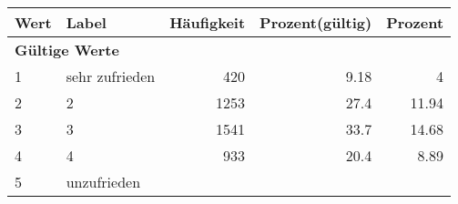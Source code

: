      \begin{longtable}{lXrrr}
     \toprule
     \textbf{Wert} & \textbf{Label} & \textbf{Häufigkeit} & \textbf{Prozent(gültig)} & \textbf{Prozent} \\
     \endhead
     \midrule
     \multicolumn{5}{l}{\textbf{Gültige Werte}}\\

     1 &
     \multicolumn{1}{X}{ sehr zufrieden   } &


       \num{420} &
       \num[round-mode=places,round-precision=2]{9,18} &
         \num[round-mode=places,round-precision=2]{4} \\

     2 &
     \multicolumn{1}{X}{ 2   } &


       \num{1253} &
       \num[round-mode=places,round-precision=2]{27,4} &
         \num[round-mode=places,round-precision=2]{11,94} \\

     3 &
     \multicolumn{1}{X}{ 3   } &


       \num{1541} &
       \num[round-mode=places,round-precision=2]{33,7} &
         \num[round-mode=places,round-precision=2]{14,68} \\

     4 &
     \multicolumn{1}{X}{ 4   } &


       \num{933} &
       \num[round-mode=places,round-precision=2]{20,4} &
         \num[round-mode=places,round-precision=2]{8,89} \\

     5 &
     \multicolumn{1}{X}{ unzufrieden   } &



\end{longtable}
